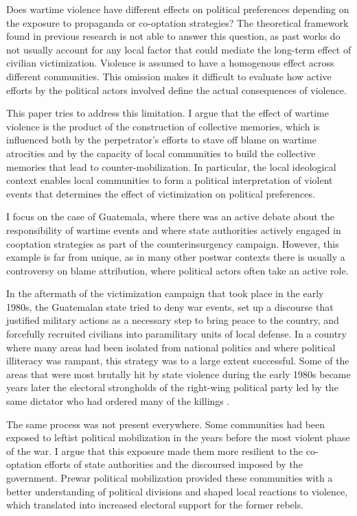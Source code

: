 \documentclass[12pt, notitlepage]{article}
\begin{document}
Does wartime violence have different effects on political preferences depending on the exposure to propaganda or co-optation strategies?
The theoretical framework found in previous research is not able to answer this question, as past works do not usually account for any local factor that could mediate the long-term effect of civilian victimization.
Violence is assumed to have a homogenous effect across different communities.
This omission makes it difficult to evaluate how active efforts by the political actors involved define the actual consequences of violence.

This paper tries to address this limitation.
I argue that the effect of wartime violence is the product of the construction of collective memories, which is influenced both by the perpetrator's efforts to stave off blame on wartime atrocities and by the capacity of local communities to build the collective memories that lead to counter-mobilization.
In particular, the local ideological context enables local communities to form a political interpretation of violent events that determines the effect of victimization on political preferences.

I focus on the case of Guatemala, where there was an active debate about the responsibility of wartime events and where state authorities actively engaged in cooptation strategies as part of the counterinsurgency campaign.
However, this example is far from unique, as in many other postwar contexts there is usually a controversy on blame attribution, where political actors often take an active role.

In the aftermath of the victimization campaign that took place in the early 1980s, the Guatemalan state tried to deny war events, set up a discourse that justified military actions as a necessary step to bring peace to the country, and forcefully recruited civilians into paramilitary units of local defense.
In a country where many areas had been isolated from national politics and where political illiteracy was rampant, this strategy was to a large extent successful.
Some of the areas that were most brutally hit by state violence during the early 1980s became years later the electoral strongholds of the right-wing political party led by the same dictator who had ordered many of the killings \citep{Ball:1999ab}.

The same process was not present everywhere.
Some communities had been exposed to leftist political mobilization in the years before the most violent phase of the war.
I argue that this exposure made them more resilient to the co-optation efforts of state authorities and the discoursed imposed by the government.
Prewar political mobilization provided these communities with a better understanding of political divisions and shaped local reactions to violence, which translated into increased electoral support for the former rebels.
\end{document}
